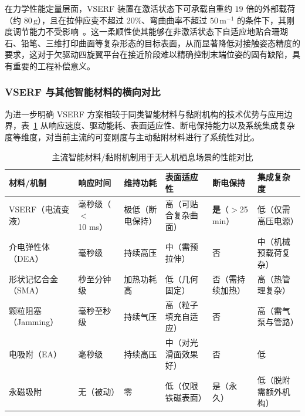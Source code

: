 在力学性能定量层面，VSERF 装置在激活状态下可承载自重约 $19$ 倍的外部载荷（约 $80\,\text{g}$），且在拉伸应变不超过 $20\%$、弯曲曲率不超过 $50\,\text{m}^{-1}$ 的条件下，其刚度调节能力不受影响~\cite{pan2022stretchable}。这一柔顺性使其能够在非激活状态下自适应地贴合珊瑚石、铅笔、三维打印曲面等复杂形态的目标表面，从而显著降低对接触姿态精度的要求，这对于欠驱动四旋翼平台在接近阶段难以精确控制末端位姿的固有缺陷，具有重要的工程补偿意义。
 
\subsubsection{VSERF 与其他智能材料的横向对比}
 
为进一步明确 VSERF 方案相较于同类智能材料与黏附机构的技术优势与应用边界，表~\ref{tab:material_comparison} 从响应速度、驱动能耗、表面适应性、断电保持能力以及系统集成复杂度等维度，对当前主流的可变刚度与主动黏附材料进行了系统性对比。

\vspace{10pt}
\begin{table}[htbp]
\centering
\caption{主流智能材料/黏附机制用于无人机栖息场景的性能对比}
\label{tab:material_comparison}
\renewcommand{\arraystretch}{1.3}
\begin{tabular}{p{}
p{}
p{}
p{}
p{}
p{}}
\toprule
\textbf{材料/机制} & \textbf{响应时间} & \textbf{维持功耗} & \textbf{表面适应性} & \textbf{断电保持} & \textbf{集成复杂度} \\
\midrule
VSERF（电流变液）
& 毫秒级（$<$10 ms）
& 极低（断电保持）
& 高（可贴合复杂曲面）
& \textbf{是}（$>$25 min）
& 低（仅需高压电源） \\
 
介电弹性体（DEA）
& 毫秒级
& 持续高压
& 中（需预拉伸）
& 否
& 中（机械预载荷复杂） \\
 
形状记忆合金（SMA）
& 秒至分钟级
& 加热功耗高
& 低（几何固定）
& 否（需持续加热）
& 高（热管理复杂） \\
 
颗粒阻塞（Jamming）
& 毫秒至秒级
& 持续气压
& 高（粒子填充自适应）
& 否
& 高（需气泵与管路） \\
 
电吸附（EA）
& 毫秒级
& 持续高压
& 中（对光滑面效果好）
& 否
& 低
\\
 
永磁吸附
& 无（被动）
& 零
& 低（仅限铁磁表面）
& 是（永久）
& 低（脱附需额外机构） \\
 
\bottomrule
\end{tabular}
\end{table}
 
